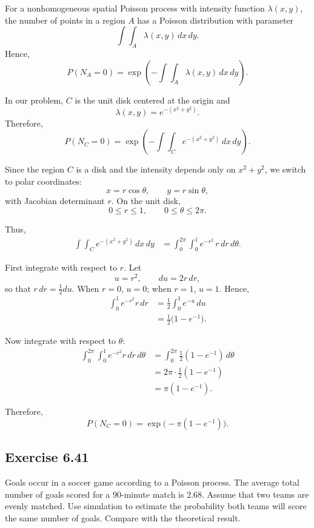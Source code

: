 \documentclass[hidelinks]{article}
\begin{document}
\noindent For a nonhomogeneous spatial Poisson process with intensity function
$\lambda(x,y)$, the number of points in a region $A$ has a Poisson
distribution with parameter
\[
\int\!\!\!\int_A \lambda(x,y)\,dx\,dy.
\]
Hence,
\[
P(N_A = 0)
= \exp\!\left(-\int\!\!\!\int_A \lambda(x,y)\,dx\,dy\right).
\]

\noindent In our problem, $C$ is the unit disk centered at the origin and
\[
\lambda(x,y)=e^{-(x^2+y^2)}.
\]
Therefore,
\[
P(N_C = 0)
=
\exp\!\left(-\int\!\!\!\int_C e^{-(x^2+y^2)}\,dx\,dy\right).
\]

\medskip

\noindent Since the region $C$ is a disk and the intensity depends only on
$x^2+y^2$, we switch to polar coordinates:
\[
x=r\cos\theta, \qquad y=r\sin\theta,
\]
with Jacobian determinant $r$.  On the unit disk,
\[
0 \le r \le 1, \qquad 0 \le \theta \le 2\pi.
\]

\noindent Thus,
\begin{align*}
\int\!\!\!\int_C e^{-(x^2+y^2)}\,dx\,dy
&=
\int_0^{2\pi} \int_0^1 e^{-r^2}\, r\,dr\,d\theta.
\end{align*}

\noindent First integrate with respect to $r$.  Let
\[
u = r^2, \qquad du = 2r\,dr,
\]
so that $r\,dr = \tfrac12 du$.  When $r=0$, $u=0$;
when $r=1$, $u=1$.  Hence,
\begin{align*}
\int_0^1 e^{-r^2} r\,dr
&=
\frac12 \int_0^1 e^{-u}\,du \\
&=
\frac12 \bigl(1 - e^{-1}\bigr).
\end{align*}

\noindent Now integrate with respect to $\theta$:
\begin{align*}
\int_0^{2\pi} \int_0^1 e^{-r^2} r\,dr\,d\theta
&=
\int_0^{2\pi} \frac12 (1-e^{-1})\, d\theta \\
&=
2\pi \cdot \frac12 (1-e^{-1}) \\
&=
\pi (1-e^{-1}).
\end{align*}

\medskip

\noindent Therefore,
\[
P(N_C = 0)
=
\exp\!\bigl(-\pi(1-e^{-1})\bigr).
\]

\subsection{Exercise 6.41}

\noindent Goals occur in a soccer game according to a Poisson process. 
The average total number of goals scored for a 90-minute match is 2.68. 
Assume that two teams are evenly matched. Use simulation to estimate the 
probability both teams will score the same number of goals. Compare with 
the theoretical result.
\end{document}
